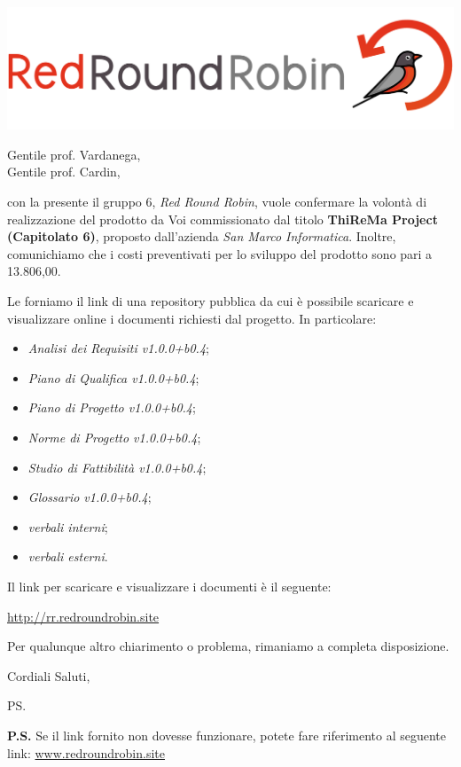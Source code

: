 \documentclass[12pt]{letter}
\date{14 Gennaio 2020}
\begin{document}
\begin{letter}{ }

\includegraphics[scale=0.17]{images/logo.png}

\opening{Gentile prof. Vardanega,\\ Gentile prof. Cardin, }

con la presente il gruppo 6, \textit{Red Round Robin}, vuole confermare la volontà di realizzazione del prodotto da Voi commissionato dal titolo 
\textbf{ThiReMa Project (Capitolato 6)}, proposto dall'azienda \textit{San Marco Informatica}. Inoltre, comunichiamo che i costi preventivati per lo sviluppo del prodotto sono pari a \EUR{}13.806,00.

Le forniamo il link di una repository pubblica da cui è possibile scaricare e visualizzare online i documenti richiesti dal progetto.
In particolare:

\begin{itemize}
	\item \textit{Analisi dei Requisiti v1.0.0+b0.4};
	\item \textit{Piano di Qualifica v1.0.0+b0.4};
	\item \textit{Piano di Progetto v1.0.0+b0.4};
	\item \textit{Norme di Progetto v1.0.0+b0.4};
	\item \textit{Studio di Fattibilità v1.0.0+b0.4};
	\item \textit{Glossario v1.0.0+b0.4};
	\item \textit{verbali interni};
	\item \textit{verbali esterni}.
\end{itemize}

Il link per scaricare e visualizzare i documenti è il seguente:

\begin{center}
\href{https://drive.google.com/open?id=17qt131a_wV08n1jLR0fiSS8FoROeKiSY}{http://rr.redroundrobin.site}
\end{center}

\newpage

Per qualunque altro chiarimento o problema, rimaniamo a completa disposizione.

\closing{Cordiali Saluti,}


\vspace{3em}
\ps 

\textbf{P.S.} Se il link fornito non dovesse funzionare, potete fare riferimento al seguente link: 
\href{https://www.redroundrobin.site}{www.redroundrobin.site}

\end{letter}
\end{document}
